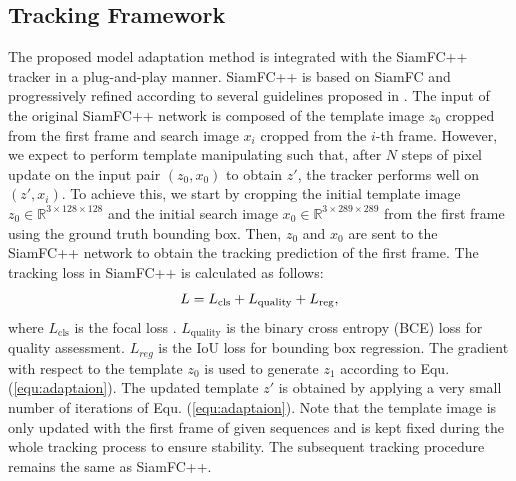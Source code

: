 \subsection{Tracking Framework}
The proposed model adaptation method is integrated with the SiamFC++ tracker \cite{SiamFC++} in a plug-and-play manner. SiamFC++ is based on SiamFC \cite{bertinetto2016fully} and progressively refined according to several guidelines proposed in \cite{SiamFC++}. The input of the original SiamFC++ network is composed of the template image $z_0$ cropped from the first frame and search image $x_i$ cropped from the $i$-th frame. However, we expect to perform template manipulating such that, after $N$ steps of pixel update on the input pair $(z_0, x_0)$ to obtain $z'$, the tracker performs well on $(z', x_i)$. To achieve this, we start by cropping the initial template image $z_0\in\mathbb R^{3\times128\times 128}$ and the initial search image $x_0\in\mathbb R^{3\times289\times 289}$ from the first frame using the ground truth bounding box.
Then, $z_0$ and $x_0$ are sent to the SiamFC++ network to obtain the tracking prediction of the first frame. The tracking loss in SiamFC++ \cite{SiamFC++} is calculated as follows:
\vspace{-0.1cm}
\begin{equation}
    L = L_{\text{cls}} + L_{\text{quality}} + L_{\text{reg}},
    \vspace{-0.1cm}
\end{equation}
where $L_{\text{cls}}$ is the focal loss \cite{lin2017focal}. $L_{\text{quality}}$ is the binary cross entropy (BCE) loss for quality assessment. $L_{reg}$ is the IoU loss \cite{yu2016unitbox} for bounding box regression. The gradient with respect to the template $z_0$ is used to generate $z_1$ according to Equ. (\ref{equ:adaptaion}). The updated template $z'$ is obtained by applying a very small number of iterations of Equ. (\ref{equ:adaptaion}). Note that the template image is only updated with the first frame of given sequences and is kept fixed during the whole tracking process to ensure stability.
The subsequent tracking procedure remains the same as SiamFC++.

